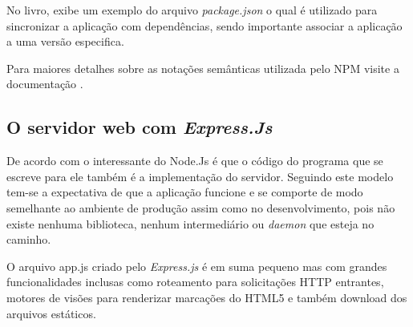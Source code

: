   No livro, \cite{Wilson:2013} exibe um exemplo do arquivo 
  \textit{package.json} o qual é utilizado para sincronizar a aplicação com dependências, sendo importante associar 
  a aplicação a uma versão especifica. 
  
  Para maiores detalhes sobre as notações semânticas utilizada pelo \ac{NPM} visite a documentação \cite{Semver:2013}.

\subsection{O servidor web com \textit{Express.Js}}
\label{servidor-web-express-js}

  
  De acordo com \cite{Wilson:2013} o interessante do Node.Js é que o código do 
  programa que se escreve para ele também é a implementação do servidor. 
  Seguindo este modelo tem-se a expectativa de que a aplicação funcione e se comporte de modo semelhante 
  ao ambiente de produção assim como no desenvolvimento, pois não existe nenhuma biblioteca, nenhum intermediário 
  ou \textit{daemon} que esteja no caminho.
  
  O arquivo app.js criado pelo \textit{Express.js} é em suma pequeno mas com grandes funcionalidades inclusas como 
  roteamento para solicitações \ac{HTTP} entrantes, motores de visões para renderizar marcações do HTML5
  e também download dos arquivos estáticos.